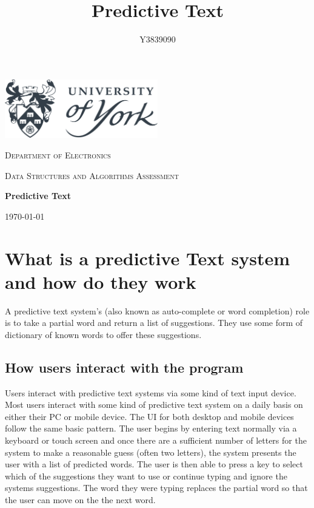 \documentclass[10pt]{article} %
\title{
	Predictive Text
}
\author{Y3839090}
\begin{document}
	\begin{titlepage}
		\centering
		\includegraphics[width=0.5\textwidth]{UoY_logo}\par\vspace{1cm}
		{\scshape\LARGE Department of Electronics \par}
		\vspace{1cm}
		{\scshape\Large Data Structures and Algorithms Assessment \par}
		\vspace{2cm}
		{\huge\bfseries Predictive Text\par}

	
		\vfill
		{\Large\itshape \@author \par}
		\vspace{2cm}
		{\large \today\par}
	\end{titlepage}
	
	\tableofcontents
	\newpage
	
	\section{What is a predictive Text system and how do they work}
		A predictive text system's (also known as  auto-complete or word completion) role is to take a partial word and return a list of suggestions. They use some form of dictionary of known words to offer these suggestions.
		\subsection{How users interact with the program}
			Users interact with predictive text systems via some kind of text input device. Most users interact with some kind of predictive text system on a daily basis on either their PC or mobile device. The UI for both desktop and mobile devices follow the same basic pattern. The user begins by entering text normally via a keyboard or touch screen and once there are a sufficient number of letters for the system to make a reasonable guess (often two letters), the system presents the user with a list of predicted words. The user is then able to press a key to select which of the suggestions they want to use or continue typing and ignore the systems suggestions. The word they were typing replaces the partial word so that the user can move on the the next word.
\end{document}
